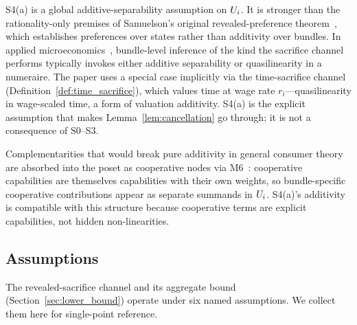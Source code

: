 \begin{remark}
\label{rem:s4a_status}
S4(a) is a global additive-separability assumption on $U_i$.
It is stronger than the rationality-only premises of Samuelson's
original revealed-preference
theorem~\citep{samuelson1938note}, which establishes preferences
over states rather than additivity over bundles.  In applied
microeconomics~\citep{mascolell1995microeconomic}, bundle-level
inference of the kind the sacrifice channel performs typically
invokes either additive separability or quasilinearity in a
numeraire.  The paper uses a special case implicitly via the
time-sacrifice channel (Definition~\ref{def:time_sacrifice}),
which values time at wage rate $r_i$---quasilinearity in
wage-scaled time, a form of valuation additivity.  S4(a) is the
explicit assumption that makes Lemma~\ref{lem:cancellation} go
through; it is not a consequence of S0--S3.

Complementarities that would break pure additivity in general
consumer theory are absorbed into the poset as cooperative
nodes via M6~\citep[Proposition~1]{lasser2026poset}: cooperative
capabilities are themselves capabilities with their own weights,
so bundle-specific cooperative contributions appear as separate
summands in $U_i$.  S4(a)'s additivity is compatible with this
structure because cooperative terms are explicit capabilities,
not hidden non-linearities.
\end{remark}

\subsection{Assumptions}
\label{sec:assumptions}

The revealed-sacrifice channel and its aggregate bound
(Section~\ref{sec:lower_bound}) operate under six named
assumptions.  We collect them here for single-point reference.

